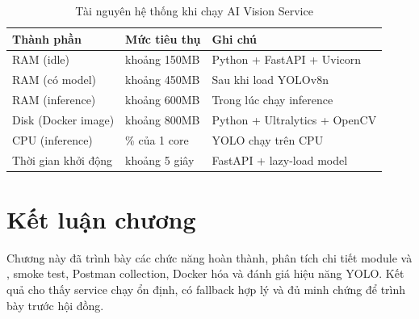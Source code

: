 \begin{table}[H]
\centering
\caption{Tài nguyên hệ thống khi chạy AI Vision Service}
\label{tab:resources}
\ReportTableFont
\begin{tabular}{|>{\raggedright\arraybackslash}p{4cm}|>{\raggedright\arraybackslash}p{4cm}|>{\raggedright\arraybackslash}p{5cm}|}
\hline
\textbf{Thành phần} & \textbf{Mức tiêu thụ} & \textbf{Ghi chú} \\
\hline
RAM (idle) & khoảng 150MB & Python + FastAPI + Uvicorn \\
\hline
RAM (có model) & khoảng 450MB & Sau khi load YOLOv8n \\
\hline
RAM (inference) & khoảng 600MB & Trong lúc chạy inference \\
\hline
Disk (Docker image) & khoảng 800MB & Python + Ultralytics + OpenCV \\
\hline
CPU (inference) & 100\% của 1 core & YOLO chạy trên CPU \\
\hline
Thời gian khởi động & khoảng 5 giây & FastAPI + lazy-load model \\
\hline
\end{tabular}
\normalsize
{}
\end{table}

\section{Kết luận chương}

Chương này đã trình bày các chức năng hoàn thành, phân tích chi tiết module  và , smoke test, Postman collection, Docker hóa và đánh giá hiệu năng YOLO. Kết quả cho thấy service chạy ổn định, có fallback hợp lý và đủ minh chứng để trình bày trước hội đồng.


